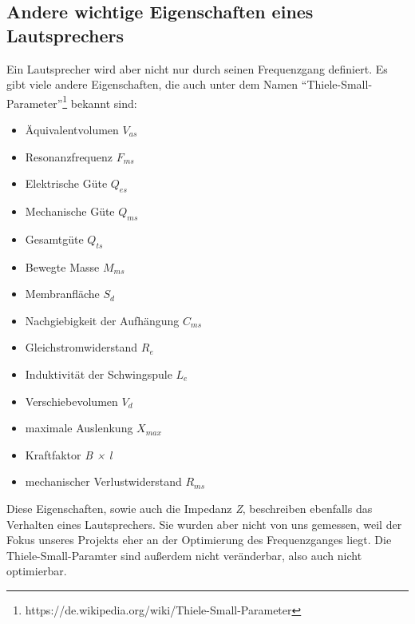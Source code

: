 \subsection{Andere wichtige Eigenschaften eines Lautsprechers}\label{subsec:5.1.1}
Ein Lautsprecher wird aber nicht nur durch seinen Frequenzgang definiert. Es gibt viele andere Eigenschaften, die auch unter dem Namen \enquote{Thiele-Small-Parameter}\footnote{https://de.wikipedia.org/wiki/Thiele-Small-Parameter} bekannt sind:
\begin{itemize}
	\item Äquivalentvolumen $ V_{as} $
	\item Resonanzfrequenz $ F_{ms} $
	\item Elektrische Güte $ Q_{es} $
	\item Mechanische Güte $ Q_{ms} $
	\item Gesamtgüte $ Q_{ts} $
	\item Bewegte Masse $ M_{ms} $
	\item Membranfläche $ S_{d} $
	\item Nachgiebigkeit der Aufhängung $ C_{ms} $
	\item Gleichstromwiderstand $ R_{e} $
	\item Induktivität der Schwingspule $ L_{e} $
	\item Verschiebevolumen $ V_{d} $
	\item maximale Auslenkung $ X_{max} $
	\item Kraftfaktor \emph{B × l}
	\item mechanischer Verlustwiderstand $ R_{ms} $
\end{itemize}
Diese Eigenschaften, sowie auch die Impedanz \emph{Z}, beschreiben ebenfalls das Verhalten eines Lautsprechers. Sie wurden aber nicht von uns gemessen, weil der Fokus unseres Projekts eher an der Optimierung des Frequenzganges liegt. Die Thiele-Small-Paramter sind außerdem nicht veränderbar, also auch nicht optimierbar.

